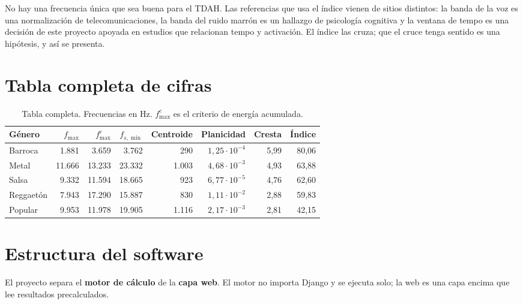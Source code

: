 \documentclass[11pt,a4paper]{article}
\newcommand{\fsmin}{f_{s,\min}}
\newcommand{\fmax}{f_{\max}}
\begin{document}
\vspace{0.5cm}
\noindent\footnotesize\color{suave}
No hay una frecuencia única que sea buena para el TDAH. Las referencias que usa
el índice vienen de sitios distintos: la banda de la voz es una normalización
de telecomunicaciones, la banda del ruido marrón es un hallazgo de psicología
cognitiva y la ventana de tempo es una decisión de este proyecto apoyada en
estudios que relacionan tempo y activación. El índice las cruza; que el cruce
tenga sentido es una hipótesis, y así se presenta.

\appendix
\section{Tabla completa de cifras}

\begin{table}[H]
\centering
\footnotesize
\begin{tabular}{@{}l r r r r r r r@{}}
\toprule
\textbf{Género} & \(\fmax\) & \(\fmax^{e}\) & \(\fsmin\) & \textbf{Centroide} &
\textbf{Planicidad} & \textbf{Cresta} & \textbf{Índice} \\
\midrule
Barroca & 1.881 & 3.659 & 3.762 & 290 & \(1{,}25\cdot10^{-4}\) & 5,99 & 80,06 \\
Metal & 11.666 & 13.233 & 23.332 & 1.003 & \(4{,}68\cdot10^{-3}\) & 4,93 & 63,88 \\
Salsa & 9.332 & 11.594 & 18.665 & 923 & \(6{,}77\cdot10^{-5}\) & 4,76 & 62,60 \\
Reggaetón & 7.943 & 17.290 & 15.887 & 830 & \(1{,}11\cdot10^{-2}\) & 2,88 & 59,83 \\
Popular & 9.953 & 11.978 & 19.905 & 1.116 & \(2{,}17\cdot10^{-3}\) & 2,81 & 42,15 \\
\bottomrule
\end{tabular}
\caption{Tabla completa. Frecuencias en Hz. \(\fmax^{e}\) es el criterio de
energía acumulada.}
\label{tab:anexo}
\end{table}

\section{Estructura del software}

El proyecto separa el \textbf{motor de cálculo} de la \textbf{capa web}. El
motor no importa Django y se ejecuta solo; la web es una capa encima que lee
resultados precalculados.
\end{document}
